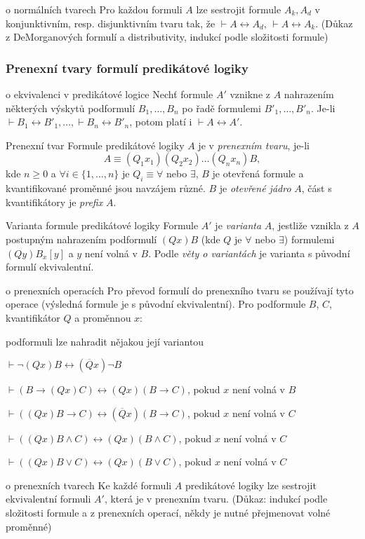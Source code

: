\begin{vetaN}{o normálních tvarech}
Pro každou formuli $A$ lze sestrojit formule $A_k,A_d$ v konjunktivním, resp. disjunktivním tvaru tak, že $\vdash A\leftrightarrow A_d$, $\vdash A\leftrightarrow A_k$. (Důkaz z DeMorganových formulí a distributivity, indukcí podle složitosti formule)
\end{vetaN}

\subsubsection*{Prenexní tvary formulí predikátové logiky}

\begin{vetaN}{o ekvivalenci v predikátové logice}
Nechť formule $A'$ vznikne z $A$ nahrazením některých výskytů podformulí $B_1,\dots,B_n$ po řadě formulemi $B'_1,\dots,B'_n$. Je-li $\vdash B_1\leftrightarrow B'_1,\dots,\vdash B_n\leftrightarrow B'_n$, potom platí i $\vdash A\leftrightarrow A'$.
\end{vetaN}

\begin{definiceN}{Prenexní tvar}
Formule predikátové logiky $A$ je v \emph{prenexním tvaru}, je-li $$A\equiv (Q_1 x_1)(Q_2 x_2)\dots(Q_n x_n)B,$$ kde $n\geq 0$ a $\forall i\in\{1,\dots,n\}$ je $Q_i\equiv \forall$ nebo $\exists$, $B$ je otevřená formule a kvantifikované proměnné jsou navzájem různé. $B$ je \emph{otevřené jádro} $A$, část s kvantifikátory je \emph{prefix} $A$.
\end{definiceN}

\begin{definiceN}{Varianta formule predikátové logiky}
Formule $A'$ je \emph{varianta} $A$, jestliže vznikla z $A$ postupným nahrazením podformulí $(Q x)B$ (kde $Q$ je $\forall$ nebo $\exists$) formulemi $(Q y)B_x[y]$ a $y$ není volná v $B$. Podle \emph{věty o variantách} je varianta s původní formulí ekvivalentní.
\end{definiceN}

\begin{lemmaN}{o prenexních operacích}
Pro převod formulí do prenexního tvaru se používají tyto operace (výsledná formule je s původní ekvivalentní). Pro podformule $B$, $C$, kvantifikátor $Q$ a proměnnou $x$:
\begin{penumerate}
    \item podformuli lze nahradit nějakou její variantou
    \item $\vdash \neg(Q x)B\leftrightarrow(\overline{Q} x)\neg B$
    \item $\vdash (B\rightarrow (Q x)C)\leftrightarrow(Q x)(B\rightarrow C)$, pokud $x$ není volná v $B$
    \item $\vdash ((Q x)B\rightarrow C)\leftrightarrow(\overline{Q} x)(B\rightarrow C)$, pokud $x$ není 
	volná v $C$
    \item $\vdash ((Q x)B\wedge C)\leftrightarrow (Q x)(B\wedge C)$, pokud $x$ není volná v $C$
    \item $\vdash ((Q x)B\vee C)\leftrightarrow (Q x)(B\vee C)$, pokud $x$ není volná v $C$
\end{penumerate}
\end{lemmaN}

\begin{vetaN}{o prenexních tvarech}
Ke každé formuli $A$ predikátové logiky lze sestrojit ekvivalentní formuli $A'$, která je v prenexním tvaru. (Důkaz: indukcí podle složitosti formule a z prenexních operací, někdy je nutné přejmenovat volné proměnné)
\end{vetaN}
